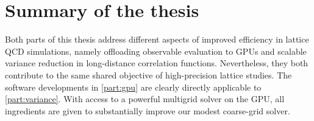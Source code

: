 \chapter{Summary of the thesis}
\label{ch:summary}





Both parts of this thesis address different aspects of improved efficiency in lattice QCD simulations, namely offloading observable evaluation to GPUs and scalable variance reduction in long-distance correlation functions.
Nevertheless, they both contribute to the same shared objective of high-precision lattice studies.
The software developments in \cref{part:gpu} are clearly directly applicable to \cref{part:variance}.
With access to a powerful multigrid solver on the GPU, all ingredients are given to substantially improve our modest coarse-grid solver.

